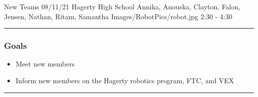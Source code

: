 \insertmeeting 
	{New Teams} 
	{08/11/21} 
	{Hagerty High School}
	{Annika, Anouska, Clayton, Falon, Jensen, Nathan, Ritam, Samantha}
	{Images/RobotPics/robot.jpg}
	{2:30 - 4:30}
	
\noindent\hfil\rule{\textwidth}{.4pt}\hfil
\subsubsection*{Goals}
\begin{itemize}
    \item Meet new members
    \item Inform new members on the Hagerty robotics program, FTC, and VEX

\end{itemize} 

\noindent\hfil\rule{\textwidth}{.4pt}\hfil


